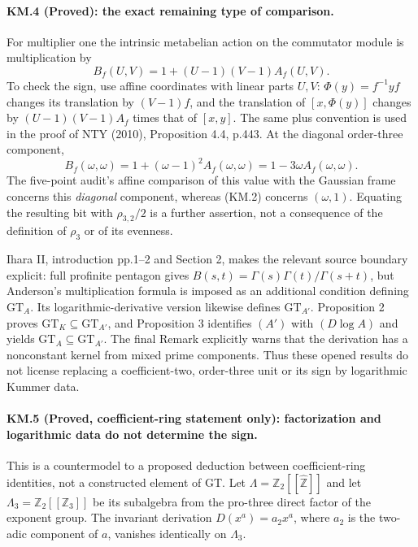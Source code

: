 \paragraph{KM.4 (Proved): the exact remaining type of comparison.}
For multiplier one the intrinsic metabelian action on the
commutator module is multiplication by
\[
 B_f(U,V)=1+(U-1)(V-1)A_f(U,V).
\]
To check the sign, use affine coordinates with linear parts $U,V$:
$\Phi(y)=f^{-1}yf$ changes its translation by $(V-1)f$,
and the translation of $[x,\Phi(y)]$ changes by
$(U-1)(V-1)A_f$ times that of $[x,y]$.
The same plus convention is used in the proof of NTY (2010),
Proposition 4.4, p.443.  At the diagonal order-three component,
\[
 B_f(\omega,\omega)
   =1+ (\omega-1)^2A_f(\omega,\omega)
   =1-3\omega A_f(\omega,\omega).
\]
The five-point audit's affine comparison of this value with the
Gaussian frame concerns this \emph{diagonal} component, whereas
(KM.2) concerns $(\omega,1)$.  Equating the resulting bit with
$\rho_{3,2}/2$ is a further assertion, not a consequence of the
definition of $\rho_3$ or of its evenness.

Ihara II, introduction pp.1--2 and Section 2, makes the relevant
source boundary explicit: full profinite pentagon gives
$B(s,t)=\Gamma(s)\Gamma(t)/\Gamma(s+t)$, but Anderson's
multiplication formula is imposed as an additional condition
defining $\mathrm{GT}_A$.  Its logarithmic-derivative version
likewise defines $\mathrm{GT}_{A'}$.  Proposition 2 proves
$\mathrm{GT}_K\subseteq\mathrm{GT}_{A'}$, and Proposition 3
identifies $(A')$ with $(D\log A)$ and yields
$\mathrm{GT}_A\subseteq\mathrm{GT}_{A'}$.
The final Remark explicitly warns that the derivation has a
nonconstant kernel from mixed prime components.  Thus these
opened results do not license replacing a coefficient-two,
order-three unit or its sign by logarithmic Kummer data.
\paragraph{KM.5 (Proved, coefficient-ring statement only): factorization and logarithmic data do not determine the sign.}
This is a countermodel to a proposed deduction between coefficient-ring
identities, not a constructed element of GT.
Let $\Lambda=\mathbb Z_2[[\widehat{\mathbb Z}]]$ and let
$\Lambda_3=\mathbb Z_2[[\mathbb Z_3]]$ be its subalgebra from
the pro-three direct factor of the exponent group.  The invariant
derivation $D(x^a)=a_2x^a$, where $a_2$ is the two-adic component
of $a$, vanishes identically on $\Lambda_3$.

